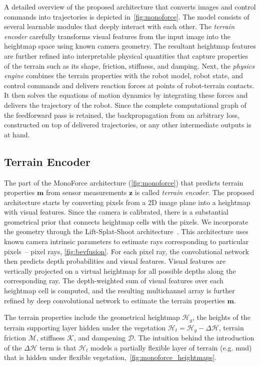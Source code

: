 A detailed overview of the proposed architecture that converts images and control commands
into trajectories is depicted in~\autoref{fig:monoforce}.
The model consists of several learnable modules that deeply interact with each other.
The \emph{terrain encoder} carefully transforms visual features from the input image
into the heightmap space using known camera geometry.
The resultant heightmap features are further refined into interpretable physical quantities
that capture properties of the terrain such as its shape, friction, stiffness, and damping.
Next, the \emph{physics engine} combines the terrain properties with the robot model,
robot state, and control commands and delivers reaction forces at points of robot-terrain contacts.
It then solves the equations of motion dynamics by integrating these forces
and delivers the trajectory of the robot.
Since the complete computational graph of the feedforward pass is retained,
the backpropagation from an arbitrary loss, constructed on top of delivered trajectories,
or any other intermediate outputs is at hand.

\subsection{Terrain Encoder}\label{subsec:terrain_encoder}

The part of the MonoForce architecture (\autoref{fig:monoforce})
that predicts terrain properties $\mathbf{m}$ from sensor measurements $\mathbf{z}$ is called \emph{terrain encoder}.
The proposed architecture starts by converting pixels from a 2D image plane into a heightmap with visual features.
Since the camera is calibrated, there is a substantial geometrical prior that connects heightmap cells with the pixels.
We incorporate the geometry through the Lift-Splat-Shoot architecture~\cite{philion2020lift}.
This architecture uses known camera intrinsic parameters to estimate rays corresponding to particular pixels~--
pixel rays, \autoref{fig:bevfusion}.
For each pixel ray, the convolutional network then predicts depth probabilities and visual features.
Visual features are vertically projected on a virtual heightmap for all possible depths along the corresponding ray.
The depth-weighted sum of visual features over each heightmap cell is computed,
and the resulting multichannel array is further refined by deep convolutional network
to estimate the terrain properties $\mathbf{m}$.

The terrain properties include the geometrical heightmap $\mathcal{H}_g$,
the heights of the terrain supporting layer hidden under the vegetation $\mathcal{H}_t = \mathcal{H}_g - \Delta\mathcal{H}$,
terrain friction $\mathcal{M}$, stiffness $\mathcal{K}$, and dampening $\mathcal{D}$.
The intuition behind the introduction of the $\Delta\mathcal{H}$ term is
that $\mathcal{H}_t$ models a partially flexible layer of terrain (e.g. mud) that is hidden under flexible vegetation,~\autoref{fig:monoforce_heightmaps}.


